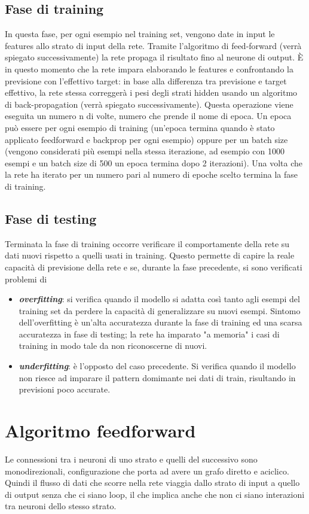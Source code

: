 \documentclass[12pt]{report}
\begin{document}
\subsection{Fase di training}
In questa fase, per ogni esempio nel training set, vengono date in input le features allo strato di input della rete. Tramite l'algoritmo di feed-forward (verrà spiegato successivamente) la rete propaga il risultato fino al neurone di output. È in questo momento che la rete impara elaborando le features e confrontando la previsione con l’effettivo target: in base alla differenza tra previsione e target effettivo, la rete stessa correggerà i pesi degli strati hidden usando un algoritmo di back-propagation (verrà spiegato successivamente).
Questa operazione viene eseguita un numero n di volte, numero che prende il nome di epoca. Un epoca può essere per ogni esempio di training (un’epoca termina quando è stato applicato feedforward e backprop per ogni esempio) oppure per un batch size (vengono considerati più esempi nella stessa iterazione, ad esempio con 1000 esempi e un batch size di 500 un epoca termina dopo 2 iterazioni).
Una volta che la rete ha iterato per un numero pari al numero di epoche scelto termina la fase di training.

\subsection{Fase di testing}
Terminata la fase di training occorre verificare il comportamente della rete su dati nuovi rispetto a quelli usati in training. Questo permette di capire la reale capacità di previsione della rete e se, durante la fase precedente, si sono verificati problemi di 
\begin{itemize}
\item{\textbf{\textit{overfitting}}}: si verifica quando il modello si adatta così tanto agli esempi del training set da perdere la capacità di generalizzare su nuovi esempi. Sintomo dell'overfitting è un'alta accuratezza durante la fase di training ed una scarsa accuratezza in fase di testing; la rete ha imparato "a memoria" i casi di training in modo tale da non riconoscerne di nuovi.
\item{\textbf{\textit{underfitting}}}: è l'opposto del caso precedente. Si verifica quando il modello non riesce ad imparare il pattern domimante nei dati di train, risultando in previsioni poco accurate.
\end{itemize}

\section{Algoritmo feedforward}
Le connessioni tra i neuroni di uno strato e quelli del successivo sono monodirezionali, configurazione che porta ad avere un grafo diretto e aciclico. Quindi il flusso di dati che scorre nella rete viaggia dallo strato di input a quello di output senza che ci siano loop, il che implica anche che non ci siano interazioni tra neuroni dello stesso strato.
\end{document}
